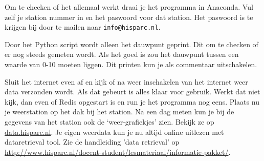 Om te checken of het allemaal werkt draai je het programma in Anaconda. Vul zelf
je \hisparc station nummer in en het paswoord voor dat station. Het paswoord is te krijgen
bij \hisparc door te mailen naar \verb|info@hisparc.nl|.

Door het Python script wordt alleen het dauwpunt geprint. Dit om te checken
of er nog steeds gemeten wordt. Als het goed is zou het dauwpunt tussen
een waarde van 0-10 moeten liggen. Dit printen kun je als commentaar uitschakelen.

Sluit het internet even af en kijk of na weer inschakelen van het internet weer
data verzonden wordt. Als dat gebeurt is alles klaar voor gebruik.
Werkt dat niet kijk, dan even of Redis opgestart is en run je het programma
nog eens.
Plaats nu je weerstation op het dak bij het station. Na een dag meten kun je
bij de gegevens van het station ook de `weer-grafiekjes' zien. Bekijk ze op
\url{data.hisparc.nl}.
Je eigen weerdata kun je nu altijd online uitlezen met dataretrieval tool. Zie de handleiding
'data retrieval' op \url{http://www.hisparc.nl/docent-student/lesmateriaal/informatie-pakket/}.


